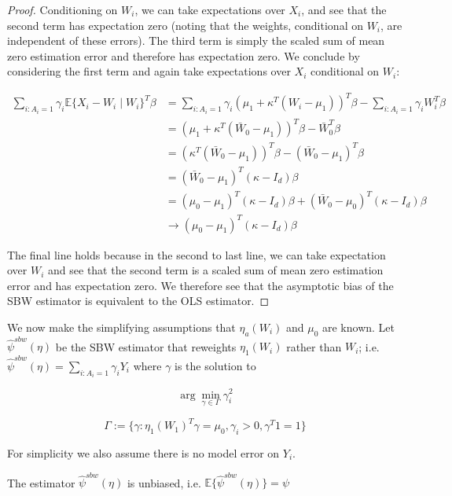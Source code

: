 \begin{proof}
Conditioning on $W_i$, we can take expectations over $X_i$, and see that the second term has expectation zero (noting that the weights, conditional on $W_i$, are independent of these errors). The third term is simply the scaled sum of mean zero estimation error and therefore has expectation zero. We conclude by considering the first term and again take expectations over $X_i$ conditional on $W_i$: 

\begin{align*}
    \sum_{i: A_i = 1} \gamma_i\mathbb{E}\{X_i - W_i \mid W_i\}^T\beta &= \sum_{i: A_i = 1} \gamma_i (\mu_1 + \kappa^T(W_i - \mu_1))^T\beta - \sum_{i: A_i = 1}\gamma_i W_i^T\beta \\
    &= (\mu_1 + \kappa^T(\bar{W}_0 - \mu_1))^T\beta - \bar{W}_0^T\beta \\
    &= (\kappa^T(\bar{W}_0 - \mu_1))^T\beta - (\bar{W}_0 - \mu_1)^T\beta  \\
    &= (\bar{W}_0 - \mu_1)^T(\kappa - I_d)\beta \\
    &= (\mu_0 - \mu_1)^T(\kappa - I_d)\beta + (\bar{W}_0 - \mu_0)^T(\kappa - I_d)\beta \\
    &\to (\mu_0 - \mu_1)^T(\kappa - I_d)\beta
\end{align*}

The final line holds because in the second to last line, we can take expectation over $W_i$ and see that the second term is a scaled sum of mean zero estimation error and has expectation zero. We therefore see that the asymptotic bias of the SBW estimator is equivalent to the OLS estimator.
\end{proof}


We now make the simplifying assumptions that $\eta_a(W_i)$ and $\mu_0$ are known. Let $\hat{\psi}^{sbw}(\eta)$ be the SBW estimator that reweights $\eta_1(W_i)$ rather than $W_i$; i.e. $\hat{\psi}^{sbw}(\eta) = \sum_{i: A_i = 1}\gamma_iY_i$ where $\gamma$ is the solution to

$$
\arg\min_{\gamma \in \Gamma} \gamma_i^2
$$

$$
\Gamma := \{\gamma: \eta_1(W_1)^T\gamma = \mu_0, \gamma_i > 0, \gamma^T1 = 1\}
$$

For simplicity we also assume there is no model error on $Y_i$. 

\begin{claim}
The estimator $\hat{\psi}^{sbw}(\eta)$ is unbiased, i.e.
$\mathbb{E}\{\hat{\psi}^{sbw}(\eta)\} = \psi$
\end{claim}

